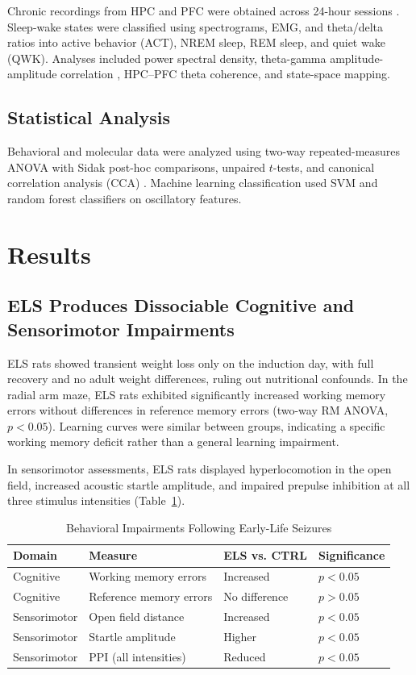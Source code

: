 \documentclass[11pt]{article}
\begin{document}
Chronic recordings from HPC and PFC were obtained across 24-hour sessions \citep{buzsaki2004large}. Sleep-wake states were classified using spectrograms, EMG, and theta/delta ratios into active behavior (ACT), NREM sleep, REM sleep, and quiet wake (QWK). Analyses included power spectral density, theta-gamma amplitude-amplitude correlation \citep{canolty2010thetagamma}, HPC--PFC theta coherence, and state-space mapping.

\subsection{Statistical Analysis}

Behavioral and molecular data were analyzed using two-way repeated-measures ANOVA with Sidak post-hoc comparisons, unpaired $t$-tests, and canonical correlation analysis (CCA) \citep{hotelling1936relations}. Machine learning classification used SVM \citep{cortes1995support} and random forest classifiers on oscillatory features.

\section{Results}

\subsection{ELS Produces Dissociable Cognitive and Sensorimotor Impairments}

ELS rats showed transient weight loss only on the induction day, with full recovery and no adult weight differences, ruling out nutritional confounds. In the radial arm maze, ELS rats exhibited significantly increased working memory errors without differences in reference memory errors (two-way RM ANOVA, $p < 0.05$). Learning curves were similar between groups, indicating a specific working memory deficit rather than a general learning impairment.

In sensorimotor assessments, ELS rats displayed hyperlocomotion in the open field, increased acoustic startle amplitude, and impaired prepulse inhibition at all three stimulus intensities (Table~\ref{tab:behavior}).

\begin{table}[ht]
\centering
\caption{Behavioral Impairments Following Early-Life Seizures}
\label{tab:behavior}
\begin{tabular}{llll}
\toprule
\textbf{Domain} & \textbf{Measure} & \textbf{ELS vs. CTRL} & \textbf{Significance} \\
\midrule
Cognitive & Working memory errors & Increased & $p < 0.05$ \\
Cognitive & Reference memory errors & No difference & $p > 0.05$ \\
Sensorimotor & Open field distance & Increased & $p < 0.05$ \\
Sensorimotor & Startle amplitude & Higher & $p < 0.05$ \\
Sensorimotor & PPI (all intensities) & Reduced & $p < 0.05$ \\
\bottomrule
\end{tabular}
\end{table}
\end{document}
